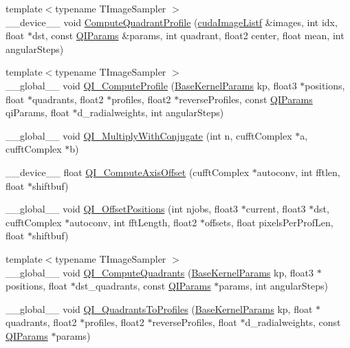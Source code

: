 \begin{DoxyCompactItemize}
{\footnotesize template$<$typename T\+Image\+Sampler $>$ }\\\+\_\+\+\_\+device\+\_\+\+\_\+ void \hyperlink{group__kernels_gad03b2eea07c1b047c3d694f187532393}{Compute\+Quadrant\+Profile} (\hyperlink{_queued_c_u_d_a_tracker_8h_a84de79f5d4b6e4c8d5622fe712c1bd69}{cuda\+Image\+Listf} \&images, int idx, float $\ast$dst, const \hyperlink{struct_q_i_params}{Q\+I\+Params} \&params, int quadrant, float2 center, float mean, int angular\+Steps)
\item 
{\footnotesize template$<$typename T\+Image\+Sampler $>$ }\\\+\_\+\+\_\+global\+\_\+\+\_\+ void \hyperlink{group__kernels_ga491f07d70a63e0fb356201b5b76ae3d5}{Q\+I\+\_\+\+Compute\+Profile} (\hyperlink{struct_base_kernel_params}{Base\+Kernel\+Params} kp, float3 $\ast$positions, float $\ast$quadrants, float2 $\ast$profiles, float2 $\ast$reverse\+Profiles, const \hyperlink{struct_q_i_params}{Q\+I\+Params} qi\+Params, float $\ast$d\+\_\+radialweights, int angular\+Steps)
\item 
\+\_\+\+\_\+global\+\_\+\+\_\+ void \hyperlink{group__kernels_gaf620f6888bd27603c02cbbcc6cb77cce}{Q\+I\+\_\+\+Multiply\+With\+Conjugate} (int n, cufft\+Complex $\ast$a, cufft\+Complex $\ast$b)
\item 
\+\_\+\+\_\+device\+\_\+\+\_\+ float \hyperlink{group__kernels_ga3cb19a139f4a1e91c1803511ae585161}{Q\+I\+\_\+\+Compute\+Axis\+Offset} (cufft\+Complex $\ast$autoconv, int fftlen, float $\ast$shiftbuf)
\item 
\+\_\+\+\_\+global\+\_\+\+\_\+ void \hyperlink{group__kernels_ga095edb116bff714a009b7cf60b52cb3b}{Q\+I\+\_\+\+Offset\+Positions} (int njobs, float3 $\ast$current, float3 $\ast$dst, cufft\+Complex $\ast$autoconv, int fft\+Length, float2 $\ast$offsets, float pixels\+Per\+Prof\+Len, float $\ast$shiftbuf)
\item 
{\footnotesize template$<$typename T\+Image\+Sampler $>$ }\\\+\_\+\+\_\+global\+\_\+\+\_\+ void \hyperlink{group__kernels_gaa7f87ffff59ddad03f962165afc5ee08}{Q\+I\+\_\+\+Compute\+Quadrants} (\hyperlink{struct_base_kernel_params}{Base\+Kernel\+Params} kp, float3 $\ast$positions, float $\ast$dst\+\_\+quadrants, const \hyperlink{struct_q_i_params}{Q\+I\+Params} $\ast$params, int angular\+Steps)
\item 
\+\_\+\+\_\+global\+\_\+\+\_\+ void \hyperlink{group__kernels_ga0a68cdd1dd0c10476711ae6d4316fb40}{Q\+I\+\_\+\+Quadrants\+To\+Profiles} (\hyperlink{struct_base_kernel_params}{Base\+Kernel\+Params} kp, float $\ast$quadrants, float2 $\ast$profiles, float2 $\ast$reverse\+Profiles, float $\ast$d\+\_\+radialweights, const \hyperlink{struct_q_i_params}{Q\+I\+Params} $\ast$params)
\end{DoxyCompactItemize}
